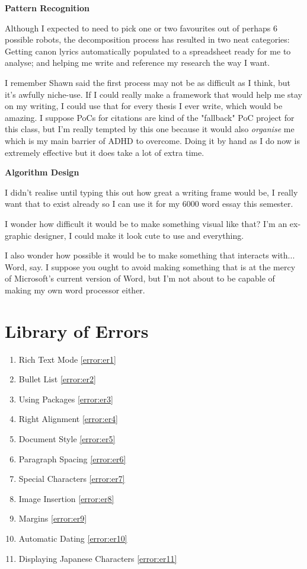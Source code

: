 \documentclass[12pt]{article}
\begin{document}
\textbf{Pattern Recognition}

Although I expected to need to pick one or two favourites out of perhaps 6 possible robots, the decomposition process has resulted in two neat categories: Getting canon lyrics automatically populated to a spreadsheet ready for me to analyse; and helping me write and reference my research the way I want.

I remember Shawn said the first process may not be as difficult as I think, but it's awfully niche-use. If I could really make a framework that would help me stay on my writing, I could use that for every thesis I ever write, which would be amazing. I suppose PoCs for citations are kind of the "fallback" PoC project for this class, but I'm really tempted by this one because it would also \textit{organise} me which is my main barrier of ADHD to overcome. Doing it by hand as I do now is extremely effective but it does take a lot of extra time.

\textbf{Algorithm Design}

I didn't realise until typing this out how great a writing frame would be, I really want that to exist already so I can use it for my 6000 word essay this semester. 

I wonder how difficult it would be to make something visual like that? I'm an ex-graphic designer, I could make it look cute to use and everything. 

I also wonder how possible it would be to make something that interacts with... Word, say. I suppose you ought to avoid making something that is at the mercy of Microsoft's current version of Word, but I'm not about to be capable of making my own word processor either.

\newpage\section{Library of Errors}
\begin{enumerate}
    \item Rich Text Mode \ref{error:er1}
    \item Bullet List \ref{error:er2}
    \item Using Packages \ref{error:er3}
    \item Right Alignment \ref{error:er4}
    \item Document Style \ref{error:er5}
    \item Paragraph Spacing \ref{error:er6}
    \item Special Characters \ref{error:er7}
    \item Image Insertion \ref{error:er8}
    \item Margins \ref{error:er9}
    \item Automatic Dating \ref{error:er10}
    \item Displaying Japanese Characters \ref{error:er11}
\end{enumerate}
\end{document}
